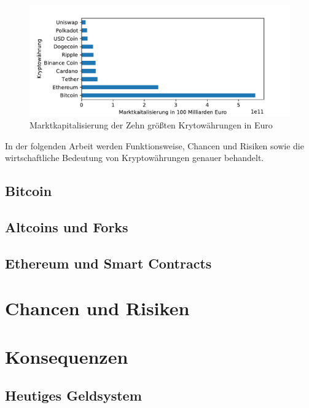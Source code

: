 \documentclass[12pt,oneside]{article}
\begin{document}
\begin{figure}[h]
\includegraphics[scale=0.9]{./images/marketcap.pdf}
\caption{Marktkapitalisierung der Zehn größten Krytowährungen in Euro}
\centering
\end{figure}


In der folgenden Arbeit werden Funktionsweise, Chancen und Risiken sowie die wirtschaftliche Bedeutung von Kryptowährungen genauer behandelt.

\subsection{Bitcoin}
\subsection{Altcoins und Forks}
\subsection{Ethereum und Smart Contracts}

\section{Chancen und Risiken}


\section{Konsequenzen}

\subsection{Heutiges Geldsystem}

\clearpage
\lhead{}
\printbibliography
{}



\end{document}
